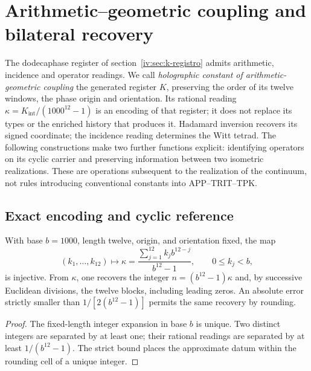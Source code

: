 \section{Arithmetic--geometric coupling and bilateral recovery}
\label{iv:sec:acoplamiento-recuperacion}

The dodecaphase register of section~\ref{iv:sec:k-registro} admits
arithmetic, incidence and operator readings. We call
\emph{holographic constant of arithmetic-geometric coupling}
the generated register \(K\), preserving the order of its twelve windows,
the phase origin and orientation. Its rational reading
\(\kappa=K_{\mathrm{int}}/(1000^{12}-1)\) is an encoding of that
register; it does not replace its types or the enriched history that produces it.
Hadamard inversion recovers its signed coordinate; the incidence
reading determines the Witt tetrad. The following constructions
make two further functions explicit: identifying operators on its cyclic
carrier and preserving information between two isometric realizations.
These are operations subsequent to the realization of the continuum, not rules
introducing conventional constants into APP--TRIT--TPK.

\subsection{Exact encoding and cyclic reference}
\label{iv:subsec:acoplamiento-codigo}

\begin{proposition}
With base \(b=1000\), length twelve, origin, and orientation fixed, the map
\[
 (k_1,\ldots,k_{12})\longmapsto
 \kappa=\frac{\sum_{j=1}^{12}k_jb^{12-j}}{b^{12}-1},
 \qquad 0\leq k_j<b,
\]
is injective. From \(\kappa\), one recovers the integer
\(n=(b^{12}-1)\kappa\) and, by successive Euclidean divisions, the twelve
blocks, including leading zeros. An absolute error strictly
smaller than \(1/[2(b^{12}-1)]\) permits the same recovery by rounding.
\end{proposition}
\begin{proof}
The fixed-length integer expansion in base \(b\) is unique. Two distinct
integers are separated by at least one; their rational readings
are separated by at least \(1/(b^{12}-1)\). The strict bound places
the approximate datum within the rounding cell of a unique integer.
\end{proof}

